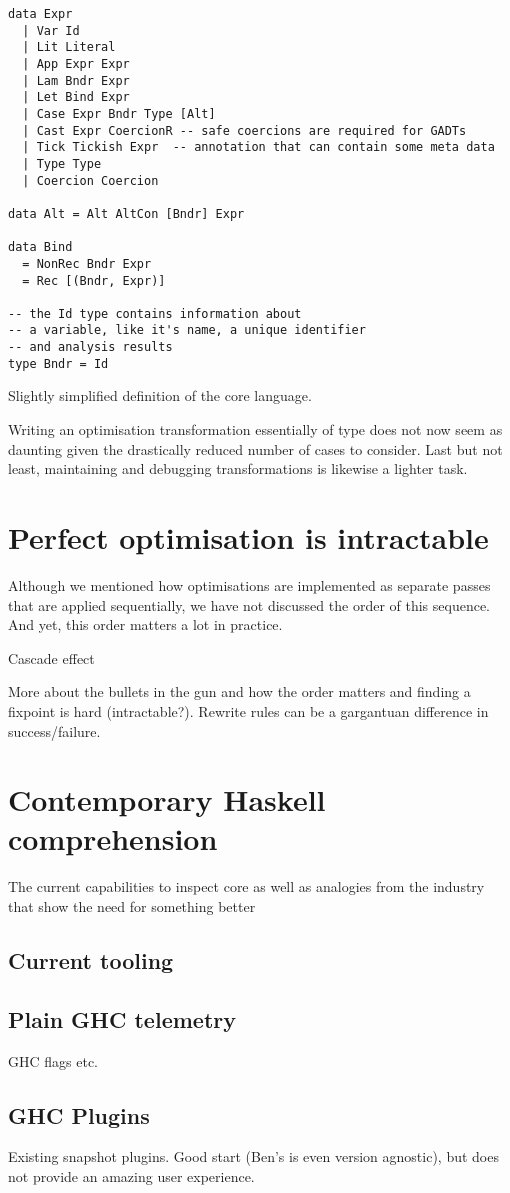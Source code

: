 \begin{listing}[H]
\begin{verbatim}
data Expr
  | Var Id
  | Lit Literal
  | App Expr Expr
  | Lam Bndr Expr
  | Let Bind Expr
  | Case Expr Bndr Type [Alt]
  | Cast Expr CoercionR -- safe coercions are required for GADTs
  | Tick Tickish Expr  -- annotation that can contain some meta data
  | Type Type
  | Coercion Coercion
  
data Alt = Alt AltCon [Bndr] Expr
 
data Bind
  = NonRec Bndr Expr
  = Rec [(Bndr, Expr)]
  
-- the Id type contains information about
-- a variable, like it's name, a unique identifier
-- and analysis results
type Bndr = Id
\end{verbatim}
\caption{Slightly simplified definition of the core language.}
\label{code:core_def}
\end{listing}

Writing an optimisation transformation essentially of type \hs{[Bind] -> [Bind]} does not now seem
as daunting given the drastically reduced number of cases to consider. 
Last but not least, maintaining and debugging transformations is likewise a lighter task.

\section{Perfect optimisation is intractable}

Although we mentioned how optimisations are implemented as separate passes that are applied sequentially, we have
not discussed the order of this sequence. And yet, this order matters a lot in practice. 

Cascade effect

More about the bullets in the gun and how the order matters and finding a fixpoint is hard (intractable?). Rewrite rules
can be a gargantuan difference in success/failure.

\section{Contemporary Haskell comprehension}
The current capabilities to inspect core as well as analogies from the industry that show the need for something better

\subsection{Current tooling}

\subsection{Plain GHC telemetry}
GHC flags etc.
\subsection{GHC Plugins}
Existing snapshot plugins. Good start (Ben's is even version agnostic), but does not provide an amazing user experience.
